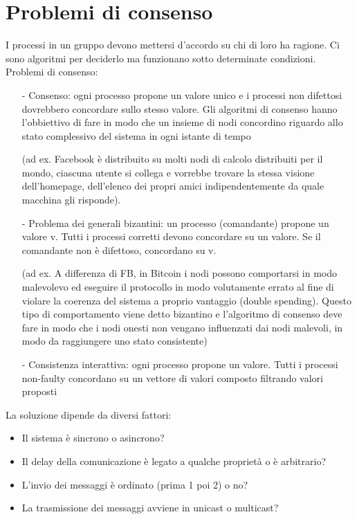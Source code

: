 \documentclass[12pt,italian]{report}
\begin{document}
\section{Problemi di consenso}
I processi in un gruppo devono mettersi d'accordo su chi di loro ha ragione. Ci sono algoritmi per deciderlo ma funzionano sotto determinate condizioni. 
\bigbreak
Problemi di consenso:
\begin{itemize}
    \item [-] Consenso: ogni processo propone un valore unico e i processi non difettosi dovrebbero concordare sullo stesso valore. Gli algoritmi di consenso hanno l'obbiettivo di fare in modo che un insieme di nodi concordino riguardo allo stato complessivo del sistema in ogni istante di tempo 
    
    (ad ex. Facebook è distribuito su molti nodi di calcolo distribuiti per il mondo, ciascuna utente si collega e vorrebbe trovare la stessa visione dell'homepage, dell'elenco dei propri amici indipendentemente da quale macchina gli risponde).
    
    \item [-] Problema dei generali bizantini: un processo (comandante) propone un valore v. Tutti i processi corretti devono concordare su un valore. Se il comandante non è difettoso, concordano su v.
    
    (ad ex. A differenza di FB, in Bitcoin i nodi possono comportarsi in modo malevolevo ed eseguire il protocollo in modo volutamente errato al fine di violare la coerenza del sistema a proprio vantaggio (double spending). Questo tipo di comportamento viene detto bizantino e l'algoritmo di consenso deve fare in modo che i nodi onesti non vengano influenzati dai nodi malevoli, in modo da raggiungere uno stato consistente)
    
    \item[-] Consistenza interattiva: ogni processo propone un valore. Tutti i processi non-faulty concordano su un vettore di valori composto filtrando valori proposti
\end{itemize}
\noindent La soluzione dipende da diversi fattori:
\begin{itemize}
    \item Il sistema è sincrono o asincrono?
    \item Il delay della comunicazione è legato a qualche proprietà o è arbitrario?
    \item L'invio dei messaggi è ordinato (prima 1 poi 2) o no?
    \item La trasmissione dei messaggi avviene in unicast o multicast?
\end{itemize}
\end{document}
